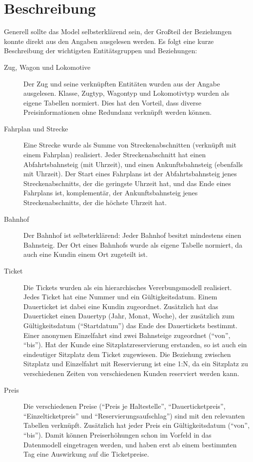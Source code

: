 \section{Beschreibung}
\label{section:Beschreibung}

Generell sollte das Model selbsterklärend sein, der Großteil der Beziehungen konnte direkt aus den Angaben ausgelesen werden. 
Es folgt eine kurze Beschreibung der wichtigsten Entitätsgruppen und Beziehungen:

\begin{description}
    \item[Zug, Wagon und Lokomotive] Der Zug und seine verknüpften Entitäten wurden aus der Angabe ausgelesen. 
    Klasse, Zugtyp, Wagontyp und Lokomotivtyp wurden als eigene Tabellen normiert. 
    Dies hat den Vorteil, dass diverse Preisinformationen ohne Redundanz verknüpft werden können.
    \item[Fahrplan und Strecke] Eine Strecke wurde als Summe von Streckenabschnitten (verknüpft mit einem Fahrplan) realisiert.
    Jeder Streckenabschnitt hat einen Abfahrtsbahnsteig (mit Uhrzeit), und einen Ankunftsbahnsteig (ebenfalls mit Uhrzeit). 
    Der Start eines Fahrplans ist der Abfahrtsbahnsteig jenes Streckenabschnitts, der die geringste Uhrzeit hat, 
    und das Ende eines Fahrplans ist, komplementär, der Ankunftsbahnsteig jenes Streckenabschnitts, der die höchste Uhrzeit hat.
    \item[Bahnhof] Der Bahnhof ist selbsterklärend: Jeder Bahnhof besitzt mindestens einen Bahnsteig. 
    Der Ort eines Bahnhofs wurde als eigene Tabelle normiert, da auch eine Kundin einem Ort zugeteilt ist.
    \item[Ticket] Die Tickets wurden als ein hierarchisches Vererbungsmodell realisiert. Jedes Ticket hat eine Nummer und ein Gültigkeitsdatum.
    Einem Dauerticket ist dabei eine Kundin zugeordnet. Zusätzlich hat das Dauerticket einen Dauertyp (Jahr, Monat, Woche), 
    der zusätzlich zum Gültigkeitsdatum (``Startdatum'') das Ende des Dauertickets bestimmt.
    Einer anonymen Einzelfahrt sind zwei Bahnsteige zugeordnet (``von'', ``bis'').
    Hat der Kunde eine Sitzplatzreservierung erstanden, so ist auch ein eindeutiger Sitzplatz dem Ticket zugewiesen.
    Die Beziehung zwischen Sitzplatz und Einzelfahrt mit Reservierung ist eine 1:N, da ein Sitzplatz zu verschiedenen Zeiten 
    von verschiedenen Kunden reserviert werden kann.
    \item[Preis] Die verschiedenen Preise (``Preis je Haltestelle'', ``Dauerticketpreis'', ``Einzelticketpreis'' und ``Reservierungsaufschlag'') 
    sind mit den relevanten Tabellen verknüpft. Zusätzlich hat jeder Preis ein Gültigkeitsdatum (``von'', ``bis''). 
    Damit können Preiserhöhungen schon im Vorfeld in das Datenmodell eingetragen werden, und haben erst ab einem bestimmten Tag eine Auswirkung auf die Ticketpreise.

\end{description}

